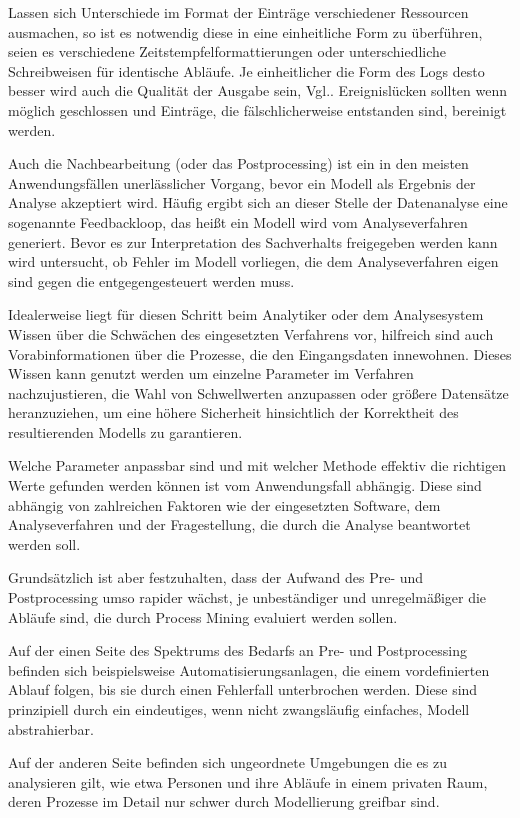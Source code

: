 Lassen sich Unterschiede im Format der Einträge verschiedener Ressourcen ausmachen, so ist es notwendig diese in eine einheitliche Form zu überführen, seien es verschiedene Zeitstempfelformattierungen oder unterschiedliche Schreibweisen für identische Abläufe. Je einheitlicher die Form des Logs desto besser wird auch die Qualität der Ausgabe sein, Vgl.\cite{PMinAction}. Ereignislücken sollten wenn möglich geschlossen und Einträge, die fälschlicherweise entstanden sind, bereinigt werden.

Auch die Nachbearbeitung (oder das Postprocessing) ist ein in den meisten Anwendungsfällen unerlässlicher Vorgang, bevor ein  Modell als Ergebnis der Analyse akzeptiert wird. Häufig ergibt sich an dieser Stelle der Datenanalyse eine sogenannte Feedbackloop, das heißt ein Modell wird vom Analyseverfahren generiert. Bevor es zur Interpretation des Sachverhalts freigegeben werden kann wird untersucht, ob Fehler im Modell vorliegen, die dem Analyseverfahren eigen sind gegen die entgegengesteuert werden muss. 

Idealerweise liegt für diesen Schritt beim Analytiker oder dem Analysesystem Wissen über die Schwächen des eingesetzten Verfahrens vor, hilfreich sind auch Vorabinformationen über die Prozesse, die den Eingangsdaten innewohnen. Dieses Wissen kann genutzt werden um einzelne Parameter im Verfahren nachzujustieren, die Wahl von Schwellwerten anzupassen oder größere Datensätze heranzuziehen, um eine höhere Sicherheit hinsichtlich der Korrektheit des resultierenden Modells zu garantieren.

Welche Parameter anpassbar sind und mit welcher Methode effektiv die richtigen Werte gefunden werden können ist vom Anwendungsfall abhängig. Diese sind abhängig von zahlreichen Faktoren wie der eingesetzten Software, dem Analyseverfahren und der Fragestellung, die durch die Analyse beantwortet werden soll.

Grundsätzlich ist aber festzuhalten, dass der Aufwand des Pre- und Postprocessing umso rapider wächst, je unbeständiger und unregelmäßiger die Abläufe sind, die durch Process Mining evaluiert werden sollen. 

Auf der einen Seite des Spektrums des Bedarfs an Pre- und Postprocessing befinden sich  beispielsweise Automatisierungsanlagen, die einem vordefinierten Ablauf folgen, bis sie durch einen Fehlerfall unterbrochen werden. Diese sind prinzipiell durch ein eindeutiges, wenn nicht zwangsläufig einfaches, Modell abstrahierbar.

Auf der anderen Seite befinden sich ungeordnete Umgebungen die es zu analysieren gilt, wie etwa Personen und ihre Abläufe in einem privaten Raum, deren Prozesse im Detail nur schwer durch Modellierung greifbar sind. 